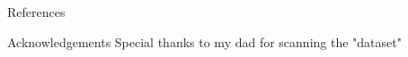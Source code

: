 \documentclass[final]{beamer}
\newlength{\onecolwid}
\newlength{\twocolwid}
\begin{document}
\begin{frame}[t]
\begin{columns}[t]
\begin{column}{\twocolwid}
\begin{columns}[t,totalwidth=\twocolwid]
\begin{column}{\onecolwid}
\begin{block}{References}

\nocite{*} %
\small{
\vspace{0.75in}}


\end{block}

\vspace{-1in}
\begin{block}{Acknowledgements}
Special thanks to my dad for scanning the "dataset"
\end{block}
\end{column}

\end{columns}



\end{column}





\end{columns}
\end{frame}
\end{document}
